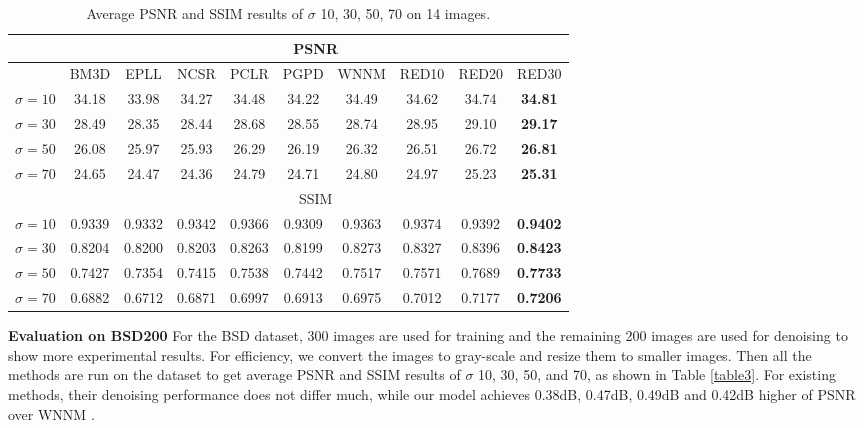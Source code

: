 \begin{table*}[htb!]
\centering
%
\caption{Average PSNR and SSIM results of $\sigma$ 10, 30, 50, 70 on 14 images.}
\begin{tabular}{c|c c c c c c c c c} \hline
              &\multicolumn{9}{c}{PSNR}            \\ \hline
              &BM3D   &EPLL   &NCSR   &PCLR   &PGPD   &WNNM   &RED10  &RED20  &RED30          \\ \hline
  $\sigma=10$ &34.18  &33.98  &34.27  &34.48  &34.22  &34.49  &34.62  &34.74  &\textbf{34.81} \\ \hline
  $\sigma=30$ &28.49  &28.35  &28.44  &28.68  &28.55  &28.74  &28.95  &29.10  &\textbf{29.17} \\ \hline
  $\sigma=50$ &26.08  &25.97  &25.93  &26.29  &26.19  &26.32  &26.51  &26.72  &\textbf{26.81} \\ \hline
  $\sigma=70$ &24.65  &24.47  &24.36  &24.79  &24.71  &24.80  &24.97  &25.23  &\textbf{25.31} \\ \hline
              &\multicolumn{9}{c}{SSIM}            \\ \hline
  $\sigma=10$ &0.9339 &0.9332 &0.9342 &0.9366 &0.9309 &0.9363 &0.9374 &0.9392 &\textbf{0.9402} \\ \hline
  $\sigma=30$ &0.8204 &0.8200 &0.8203 &0.8263 &0.8199 &0.8273 &0.8327 &0.8396 &\textbf{0.8423} \\ \hline
  $\sigma=50$ &0.7427 &0.7354 &0.7415 &0.7538 &0.7442 &0.7517 &0.7571 &0.7689 &\textbf{0.7733} \\ \hline
  $\sigma=70$ &0.6882 &0.6712 &0.6871 &0.6997 &0.6913 &0.6975 &0.7012 &0.7177 &\textbf{0.7206} \\ \hline
\end{tabular}
\label{table2}
\end{table*}



{\bf{Evaluation on BSD200}} For the BSD dataset, 300 images are used for training and
the remaining 200 images are used for denoising to show more experimental results.
For efficiency, we convert the images to gray-scale and resize them to smaller images.
Then all the methods are run on the dataset to get average PSNR and SSIM results of
$\sigma$ 10, 30, 50, and 70, as shown in Table \ref{table3}. For existing methods,
their denoising performance does not differ much, while our model achieves 0.38dB,
0.47dB, 0.49dB and 0.42dB higher of PSNR over WNNM \cite{DBLP:conf/cvpr/GuZZF14}.

